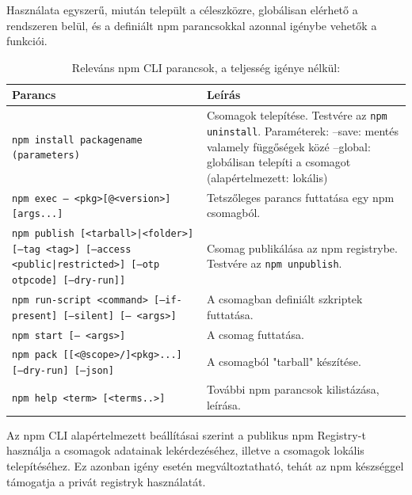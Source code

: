 Használata egyszerű, miután települt a céleszközre, globálisan elérhető a rendszeren belül, és a definiált npm parancsokkal azonnal igénybe vehetők a funkciói.
\begin{table}[h]
	\caption{Releváns npm CLI parancsok, a teljesség igénye nélkül:}
	\label{tab:npm-cli}
	\begin{tabularx}{\textwidth} { 
			| >{\centering\arraybackslash}X 
			| >{\centering\arraybackslash}X |}
		\hline
		\textbf{Parancs} & \textbf{Leírás} \\
		\hline
		\texttt{npm install packagename (parameters)} & Csomagok telepítése. Testvére az \texttt{npm uninstall}. Paraméterek: 
		\newline--save: mentés valamely függőségek közé
		\newline--global: globálisan telepíti a csomagot (alapértelmezett: lokális)
		\\
		\hline
		\texttt{npm exec -- <pkg>[@<version>] [args...]} & Tetszőleges parancs futtatása egy npm csomagból.
		\\
		\hline
		\texttt{npm publish [<tarball>|<folder>] [--tag <tag>] [--access <public|restricted>] [--otp otpcode] [--dry-run]]} & Csomag publikálása az npm registrybe. Testvére az \texttt{npm unpublish}.
		\\
		\hline
		\texttt{npm run-script <command> [--if-present] [--silent] [-- <args>]} & A csomagban definiált szkriptek futtatása.
		\\
		\hline
		\texttt{npm start [-- <args>]} & A csomag futtatása.
		\\
		\hline
		\texttt{npm pack [[<@scope>/]<pkg>...] [--dry-run] [--json]} & A csomagból "tarball" készítése.
		\\
		\hline
		\texttt{npm help <term> [<terms..>]} & További npm parancsok kilistázása, leírása.
		\\
		\hline
	\end{tabularx}
\end{table}

Az npm CLI alapértelmezett beállításai szerint a publikus npm Registry-t használja a csomagok adatainak lekérdezéséhez, illetve a csomagok lokális telepítéséhez. Ez azonban igény esetén megváltoztatható, tehát az npm készséggel támogatja a privát registryk használatát.

\begin{flushright}
	\cite{npm-cli}
\end{flushright}